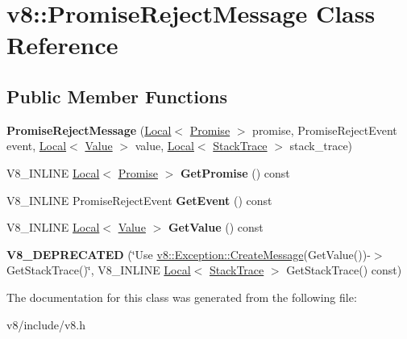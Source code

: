 \hypertarget{classv8_1_1PromiseRejectMessage}{}\section{v8\+:\+:Promise\+Reject\+Message Class Reference}
\label{classv8_1_1PromiseRejectMessage}
\subsection*{Public Member Functions}
\begin{DoxyCompactItemize}
\item 
{\bfseries Promise\+Reject\+Message} (\hyperlink{classv8_1_1Local}{Local}$<$ \hyperlink{classv8_1_1Promise}{Promise} $>$ promise, Promise\+Reject\+Event event, \hyperlink{classv8_1_1Local}{Local}$<$ \hyperlink{classv8_1_1Value}{Value} $>$ value, \hyperlink{classv8_1_1Local}{Local}$<$ \hyperlink{classv8_1_1StackTrace}{Stack\+Trace} $>$ stack\+\_\+trace)\hypertarget{classv8_1_1PromiseRejectMessage_a052df173c75f1eb31b252714c88f3362}{}\label{classv8_1_1PromiseRejectMessage_a052df173c75f1eb31b252714c88f3362}

\item 
V8\+\_\+\+I\+N\+L\+I\+NE \hyperlink{classv8_1_1Local}{Local}$<$ \hyperlink{classv8_1_1Promise}{Promise} $>$ {\bfseries Get\+Promise} () const \hypertarget{classv8_1_1PromiseRejectMessage_a8582107385b66f911c6d4c9a17890222}{}\label{classv8_1_1PromiseRejectMessage_a8582107385b66f911c6d4c9a17890222}

\item 
V8\+\_\+\+I\+N\+L\+I\+NE Promise\+Reject\+Event {\bfseries Get\+Event} () const \hypertarget{classv8_1_1PromiseRejectMessage_a1380024500dac27eb74665701a80c6b0}{}\label{classv8_1_1PromiseRejectMessage_a1380024500dac27eb74665701a80c6b0}

\item 
V8\+\_\+\+I\+N\+L\+I\+NE \hyperlink{classv8_1_1Local}{Local}$<$ \hyperlink{classv8_1_1Value}{Value} $>$ {\bfseries Get\+Value} () const \hypertarget{classv8_1_1PromiseRejectMessage_ad87ec78d2e817b623d996f8db7d45ffc}{}\label{classv8_1_1PromiseRejectMessage_ad87ec78d2e817b623d996f8db7d45ffc}

\item 
{\bfseries V8\+\_\+\+D\+E\+P\+R\+E\+C\+A\+T\+ED} (\char`\"{}Use \hyperlink{classv8_1_1Exception_a8d575a721cf0fd5b325afb8b586c0d1e}{v8\+::\+Exception\+::\+Create\+Message}(Get\+Value())-\/$>$Get\+Stack\+Trace()\char`\"{}, V8\+\_\+\+I\+N\+L\+I\+NE \hyperlink{classv8_1_1Local}{Local}$<$ \hyperlink{classv8_1_1StackTrace}{Stack\+Trace} $>$ Get\+Stack\+Trace() const)\hypertarget{classv8_1_1PromiseRejectMessage_af768aa21023875a4037d797d1e91fe42}{}\label{classv8_1_1PromiseRejectMessage_af768aa21023875a4037d797d1e91fe42}

\end{DoxyCompactItemize}


The documentation for this class was generated from the following file\+:\begin{DoxyCompactItemize}
\item 
v8/include/v8.\+h\end{DoxyCompactItemize}

